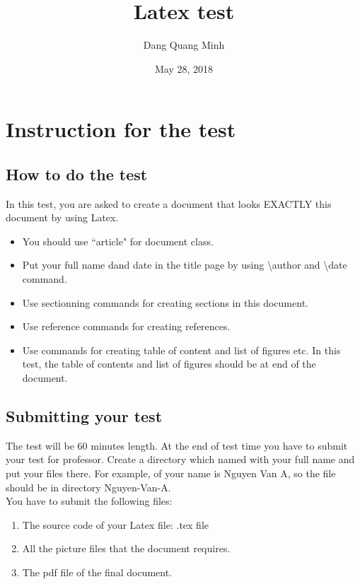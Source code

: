 \documentclass[a4paper]{article}
\begin{document}
\title{Latex test}
\author{Dang Quang Minh}
\date{May 28, 2018}

\maketitle

\section{Instruction for the test}
\subsection{How to do the test}
	In this test, you are asked to create a document that looks EXACTLY this document by using Latex.
	\begin{itemize}
		\item You should use ``article" for document class.
		\item Put your full name dand date in the title page by using \textsf{\textbackslash author} and \textsf{\textbackslash date} command.
		\item Use sectionning commands for creating sections in this document.
		\item Use reference commands for creating references.
		\item Use commands for creating table of content and list of figures etc. In this test, the table of contents and list of figures should be at end of the document.
	\end{itemize}

\subsection{Submitting your test}
The test will be 60 minutes length. At the end of test time you have to submit your test for professor. Create a directory which named with your full name and put your files there. For example, of your name is Nguyen Van A, so the file should be in directory Nguyen-Van-A.\\
You have to submit the following files:
\begin{enumerate}
	\item The source code of your Latex file: .tex file
	\item All the picture files that the document requires.
	\item The pdf file of the final document.
\end{enumerate}
\end{document}
